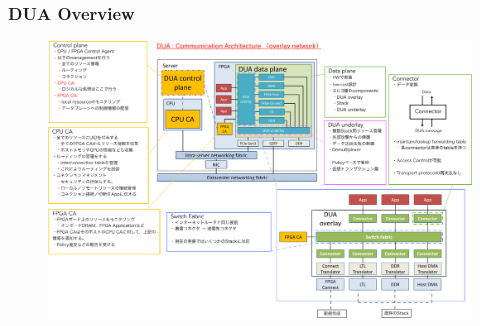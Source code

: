 \documentclass[dvipdfmx,9pt,notheorems]{beamer}
\theoremstyle{definition}
\begin{document}
\begin{frame}\frametitle{DUA Overview}
  \begin{figure}[htb]
		\includegraphics[width=\linewidth]{fig/ez_DUA_high_overview.pdf}
  \end{figure}
\pnote{
}
\end{frame}



\end{document}
